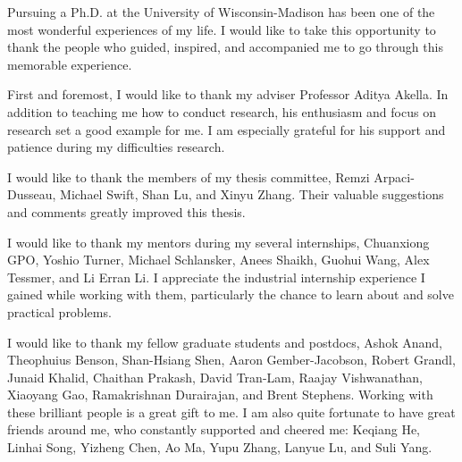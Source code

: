 \begin{acknowledgments}

Pursuing a Ph.D. at the University of Wisconsin-Madison has been one of the most wonderful experiences of my life. I would like to take this opportunity to thank the people who guided, inspired, and accompanied me to go through this memorable experience.
 
First and foremost, I would like to thank my adviser Professor Aditya Akella. In addition to teaching me how to conduct research, his enthusiasm and focus on research set a good example for me. I am especially grateful for his support and patience during my difficulties research.
 
I would like to thank the members of my thesis committee, Remzi Arpaci-Dusseau, Michael Swift, Shan Lu, and Xinyu Zhang. Their valuable suggestions and comments greatly improved this thesis.
 
I would like to thank my mentors during my several internships, Chuanxiong GPO, Yoshio Turner, Michael Schlansker, Anees Shaikh, Guohui Wang, Alex Tessmer, and Li Erran Li. I appreciate the industrial internship 
experience I gained while working with them, particularly the chance to learn about and solve practical problems.
 
I would like to thank my fellow graduate students and postdocs, Ashok Anand, Theophuius Benson, Shan-Hsiang Shen, Aaron Gember-Jacobson, Robert Grandl, Junaid Khalid, Chaithan Prakash, David Tran-Lam, Raajay Vishwanathan, Xiaoyang Gao, Ramakrishnan Durairajan, and Brent Stephens. Working with these brilliant people is a great gift to me. I am also quite fortunate to have great friends around me, who constantly supported and cheered me: Keqiang He, Linhai Song, Yizheng Chen, Ao Ma, Yupu Zhang, Lanyue Lu, and Suli Yang.
 

\end{acknowledgments}

\tableofcontents
\listoftables
\listoffigures

